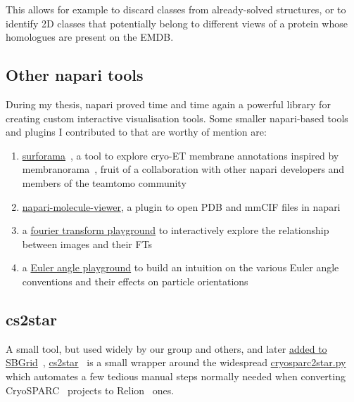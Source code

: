 This allows for example to discard classes from already-solved structures, or to identify 2D classes that potentially belong to different views of a protein whose homologues are present on the EMDB.



\subsection{Other napari tools}

During my thesis, napari proved time and time again a powerful library for creating custom interactive visualisation tools.
Some smaller napari-based tools and plugins I contributed to that are worthy of mention are:

\begin{enumerate}
    \item \href{https://github.com/cellcanvas/surforama}{surforama}~\cite{yamauchiSurforamaInteractiveExploration2024}, a tool to explore cryo-ET membrane annotations inspired by membranorama~\cite{tegunovDtegunovMembranorama2024}, fruit of a collaboration with other napari developers and members of the teamtomo community
    \item \href{https://github.com/brisvag/napari-molecule-reader}{napari-molecule-viewer}, a plugin to open PDB and mmCIF files in napari
    \item a \href{https://github.com/napari/napari/blob/main/examples/fourier_transform_playground.py}{fourier transform playground} to interactively explore the relationship between images and their FTs
    \item a \href{https://gist.github.com/brisvag/d6394d05b2f994e083ec279d6976484f}{Euler angle playground} to build an intuition on the various Euler angle conventions and their effects on particle orientations
\end{enumerate}

\subsection{cs2star}

A small tool, but used widely by our group and others, and later \href{https://sbgrid.org/software/titles/cs2star}{added to SBGrid}~\cite{morinCuttingEdgeCollaboration2013}, \href{https://github.com/brisvag/cs2star}{cs2star}~\cite{gaifasCs2starPy2021} is a small wrapper around the widespread \href{https://github.com/asarnow/pyem}{cryosparc2star.py} which automates a few tedious manual steps normally needed when converting CryoSPARC~\cite{punjaniCryoSPARCAlgorithmsRapid2017} projects to Relion~\cite{scheresRELIONImplementationBayesian2012} ones.

